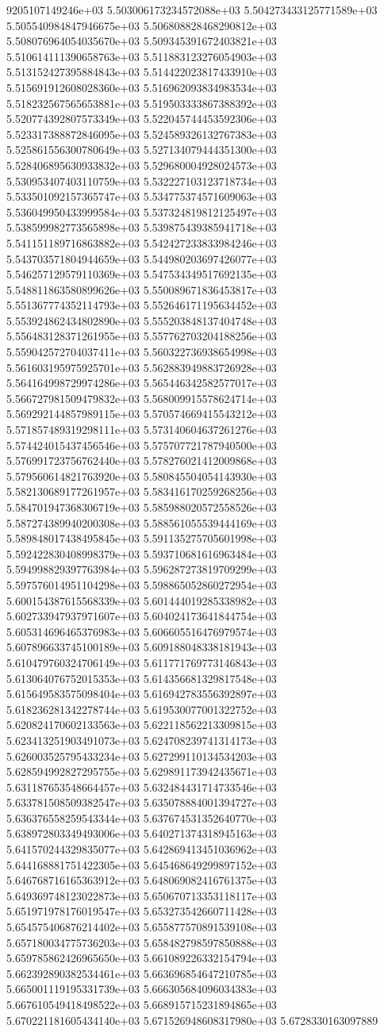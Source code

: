 9205107149246e+03	5.503006173234572088e+03	5.504273433125771589e+03	5.505540984847946675e+03	5.506808828468290812e+03	5.508076964054035670e+03	5.509345391672403821e+03	5.510614111390658763e+03	5.511883123276054903e+03	5.513152427395884843e+03	5.514422023817433910e+03	5.515691912608028360e+03	5.516962093834983534e+03	5.518232567565653881e+03	5.519503333867388392e+03	5.520774392807573349e+03	5.522045744453592306e+03	5.523317388872846095e+03	5.524589326132767383e+03	5.525861556300780649e+03	5.527134079444351300e+03	5.528406895630933832e+03	5.529680004928024573e+03	5.530953407403110759e+03	5.532227103123718734e+03	5.533501092157365747e+03	5.534775374571609063e+03	5.536049950433999584e+03	5.537324819812125497e+03	5.538599982773565898e+03	5.539875439385941718e+03	5.541151189716863882e+03	5.542427233833984246e+03	5.543703571804944659e+03	5.544980203697426077e+03	5.546257129579110369e+03	5.547534349517692135e+03	5.548811863580899626e+03	5.550089671836453817e+03	5.551367774352114793e+03	5.552646171195634452e+03	5.553924862434802890e+03	5.555203848137404748e+03	5.556483128371261955e+03	5.557762703204188256e+03	5.559042572704037411e+03	5.560322736938654998e+03	5.561603195975925701e+03	5.562883949883726928e+03	5.564164998729974286e+03	5.565446342582577017e+03	5.566727981509479832e+03	5.568009915578624714e+03	5.569292144857989115e+03	5.570574669415543212e+03	5.571857489319298111e+03	5.573140604637261276e+03	5.574424015437456546e+03	5.575707721787940500e+03	5.576991723756762440e+03	5.578276021412009868e+03	5.579560614821763920e+03	5.580845504054143930e+03	5.582130689177261957e+03	5.583416170259268256e+03	5.584701947368306719e+03	5.585988020572558526e+03	5.587274389940200308e+03	5.588561055539444169e+03	5.589848017438495845e+03	5.591135275705601998e+03	5.592422830408998379e+03	5.593710681616963484e+03	5.594998829397763984e+03	5.596287273819709299e+03	5.597576014951104298e+03	5.598865052860272954e+03	5.600154387615568339e+03	5.601444019285338982e+03	5.602733947937971607e+03	5.604024173641844754e+03	5.605314696465376983e+03	5.606605516476979574e+03	5.607896633745100189e+03	5.609188048338181943e+03	5.610479760324706149e+03	5.611771769773146843e+03	5.613064076752015353e+03	5.614356681329817548e+03	5.615649583575098404e+03	5.616942783556392897e+03	5.618236281342278744e+03	5.619530077001322752e+03	5.620824170602133563e+03	5.622118562213309815e+03	5.623413251903491073e+03	5.624708239741314173e+03	5.626003525795433234e+03	5.627299110134534203e+03	5.628594992827295755e+03	5.629891173942435671e+03	5.631187653548664457e+03	5.632484431714733546e+03	5.633781508509382547e+03	5.635078884001394727e+03	5.636376558259543344e+03	5.637674531352640770e+03	5.638972803349493006e+03	5.640271374318945163e+03	5.641570244329835077e+03	5.642869413451036962e+03	5.644168881751422305e+03	5.645468649299897152e+03	5.646768716165363912e+03	5.648069082416761375e+03	5.649369748123022873e+03	5.650670713353118117e+03	5.651971978176019547e+03	5.653273542660711428e+03	5.654575406876214402e+03	5.655877570891539108e+03	5.657180034775736203e+03	5.658482798597850888e+03	5.659785862426965650e+03	5.661089226332154794e+03	5.662392890382534461e+03	5.663696854647210785e+03	5.665001119195331739e+03	5.666305684096034383e+03	5.667610549418498522e+03	5.668915715231894865e+03	5.670221181605434140e+03	5.671526948608317980e+03	5.6728330163097889